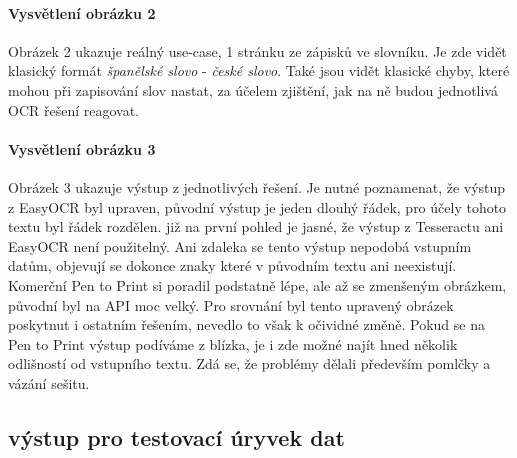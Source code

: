 \documentclass[journal]{IEEEtran}
\begin{document}
\paragraph{Vysvětlení obrázku 2}
Obrázek 2 ukazuje reálný use-case, 1 stránku ze zápisků ve slovníku.
Je zde vidět klasický formát \textit{španělské slovo} - \textit{české slovo}.
Také jsou vidět klasické chyby, které mohou při zapisování slov nastat, za účelem zjištění, jak na ně budou jednotlivá \ac{OCR} řešení reagovat.

\paragraph{Vysvětlení obrázku 3}
Obrázek 3 ukazuje výstup z jednotlivých řešení.
Je nutné poznamenat, že výstup z EasyOCR byl upraven, původní výstup je jeden dlouhý řádek, pro účely tohoto textu byl řádek rozdělen.
již na první pohled je jasné, že výstup z Tesseractu ani EasyOCR není použitelný.
Ani zdaleka se tento výstup nepodobá vstupním datům, objevují se dokonce znaky které v původním textu ani neexistují.
Komerční Pen to Print si poradil podstatně lépe, ale až se zmenšeným obrázkem, původní byl na \ac{API} moc velký.
Pro srovnání byl tento upravený obrázek poskytnut i ostatním řešením, nevedlo to však k očividné změně.
Pokud se na Pen to Print výstup podíváme z blízka, je i zde možné najít hned několik odlišností od vstupního textu.
Zdá se, že problémy dělali především pomlčky a vázání sešitu.

\subsection{výstup pro testovací úryvek dat}
\end{document}
